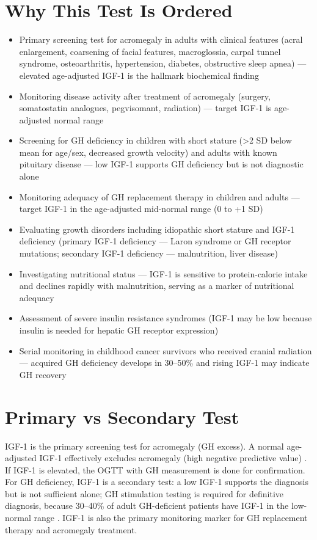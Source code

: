 \section*{Why This Test Is Ordered}
\begin{itemize}
  \item Primary screening test for acromegaly in adults with clinical features (acral enlargement, coarsening of facial features, macroglossia, carpal tunnel syndrome, osteoarthritis, hypertension, diabetes, obstructive sleep apnea) --- elevated age-adjusted IGF-1 is the hallmark biochemical finding
  \item Monitoring disease activity after treatment of acromegaly (surgery, somatostatin analogues, pegvisomant, radiation) --- target IGF-1 is age-adjusted normal range
  \item Screening for GH deficiency in children with short stature (>2 SD below mean for age/sex, decreased growth velocity) and adults with known pituitary disease --- low IGF-1 supports GH deficiency but is not diagnostic alone
  \item Monitoring adequacy of GH replacement therapy in children and adults --- target IGF-1 in the age-adjusted mid-normal range (0 to +1 SD) \cite{grimberg2016guidelines}
  \item Evaluating growth disorders including idiopathic short stature and IGF-1 deficiency (primary IGF-1 deficiency --- Laron syndrome or GH receptor mutations; secondary IGF-1 deficiency --- malnutrition, liver disease)
  \item Investigating nutritional status --- IGF-1 is sensitive to protein-calorie intake and declines rapidly with malnutrition, serving as a marker of nutritional adequacy
  \item Assessment of severe insulin resistance syndromes (IGF-1 may be low because insulin is needed for hepatic GH receptor expression)
  \item Serial monitoring in childhood cancer survivors who received cranial radiation --- acquired GH deficiency develops in 30--50\% and rising IGF-1 may indicate GH recovery
\end{itemize}

\section*{Primary vs Secondary Test}
IGF-1 is the primary screening test for acromegaly (GH excess). A normal age-adjusted IGF-1 effectively excludes acromegaly (high negative predictive value) \cite{melmed2006acromegaly}. If IGF-1 is elevated, the OGTT with GH measurement is done for confirmation. For GH deficiency, IGF-1 is a secondary test: a low IGF-1 supports the diagnosis but is not sufficient alone; GH stimulation testing is required for definitive diagnosis, because 30--40\% of adult GH-deficient patients have IGF-1 in the low-normal range \cite{molitch2011evaluation}. IGF-1 is also the primary monitoring marker for GH replacement therapy and acromegaly treatment.

